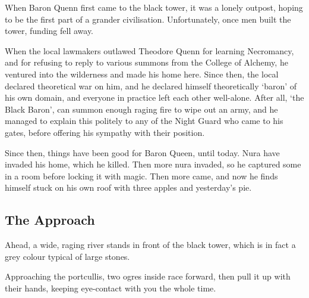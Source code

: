 \begin{multicols}{2}

\begin{exampletext}

	When Baron Quenn first came to the black tower, it was a lonely outpost, hoping to be the first part of a grander civilisation.
	Unfortunately, once men built the tower, funding fell away.

	When the local lawmakers outlawed Theodore Quenn for learning Necromancy, and for refusing to reply to various summons from the College of Alchemy, he ventured into the wilderness and made his home here.
	Since then, the local declared theoretical war on him, and he declared himself theoretically `baron' of his own domain, and everyone in practice left each other well-alone.
	After all, `the Black Baron', can summon enough raging fire to wipe out an army, and he managed to explain this politely to any of the Night Guard who came to his gates, before offering his sympathy with their position.

	Since then, things have been good for Baron Queen, until today.
	Nura have invaded his home, which he killed.
	Then more nura invaded, so he captured some in a room before locking it with magic.
	Then more came, and now he finds himself stuck on his own roof with three apples and yesterday's pie.

\end{exampletext}

\subsection{The Approach}

\setcounter{list}{0}

\begin{boxtext}

	Ahead, a wide, raging river stands in front of the black tower, which is in fact a grey colour typical of large stones.

\end{boxtext}





\begin{boxtext}

	Approaching the portcullis, two ogres inside race forward, then pull it up with their hands, keeping eye-contact with you the whole time.


\end{boxtext}
\end{multicols}
